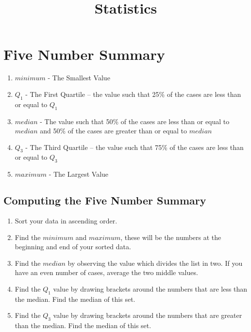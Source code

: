 \documentclass{article}
\title{Statistics}
\date{}
\begin{document}
\maketitle

\section{Five Number Summary}
\begin{enumerate}
    \item $minimum$ - The Smallest Value
    \item $Q_1$ - The First Quartile -- the value such that 25\% of the cases are less than
        or equal to $Q_1$
    \item $median$ - The value such that 50\% of the cases are less
        than or equal to $median$ and 50\% of the cases are greater than
        or equal to $median$
    \item $Q_3$ - The Third Quartile -- the value such that 75\% of the cases are less than
        or equal to $Q_3$
    \item $maximum$ - The Largest Value
\end{enumerate}

\subsection{Computing the Five Number Summary}
\begin{enumerate}
    \item Sort your data in ascending order.
    \item Find the $minimum$ and $maximum$, these will be the numbers
        at the beginning and end of your sorted data.
    \item Find the $median$ by observing the value which divides the
        list in two.  If you have an even number of cases, average the
        two middle values.
    \item Find the $Q_1$ value by drawing brackets around the numbers
        that are less than the median.  Find the median of this set.
    \item Find the $Q_3$ value by drawing brackets around the numbers
        that are greater than the median. Find the median of this set.
\end{enumerate}
\end{document}

